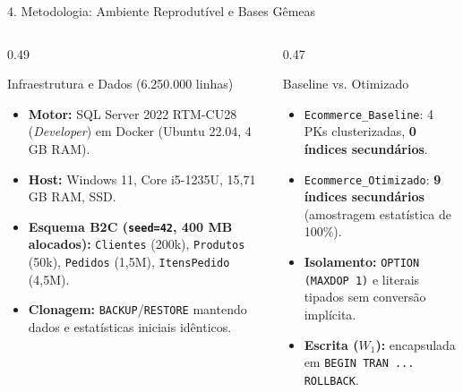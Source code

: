 \documentclass[aspectratio=169,11pt]{beamer}
\begin{document}
\begin{frame}{4. Metodologia: Ambiente Reprodutível e Bases Gêmeas}
  \begin{columns}[T]
    \begin{column}{0.49\textwidth}
      \begin{block}{Infraestrutura e Dados (6.250.000 linhas)}
        \begin{itemize}
          \item \textbf{Motor:} SQL Server 2022 RTM-CU28 (\textit{Developer}) em Docker (Ubuntu 22.04, 4 GB RAM).
          \item \textbf{Host:} Windows 11, Core i5-1235U, 15,71 GB RAM, SSD.
          \item \textbf{Esquema B2C (\texttt{seed=42}, 400 MB alocados):} \texttt{Clientes} (200k), \texttt{Produtos} (50k), \texttt{Pedidos} (1,5M), \texttt{ItensPedido} (4,5M).
          \item \textbf{Clonagem:} \texttt{BACKUP}/\texttt{RESTORE} mantendo dados e estatísticas iniciais idênticos.
        \end{itemize}
      \end{block}
    \end{column}
    \begin{column}{0.47\textwidth}
      \begin{block}{Baseline vs. Otimizado}
        \begin{itemize}
          \item \texttt{Ecommerce\_Baseline}: 4 PKs clusterizadas, \textbf{0 índices secundários}.
          \item \texttt{Ecommerce\_Otimizado}: \textbf{9 índices secundários} (amostragem estatística de 100\%).
          \item \textbf{Isolamento:} \texttt{OPTION (MAXDOP 1)} e literais tipados sem conversão implícita.
          \item \textbf{Escrita ($W_1$):} encapsulada em \texttt{BEGIN TRAN ... ROLLBACK}.
        \end{itemize}
      \end{block}
    \end{column}
  \end{columns}
\end{frame}
\end{document}
